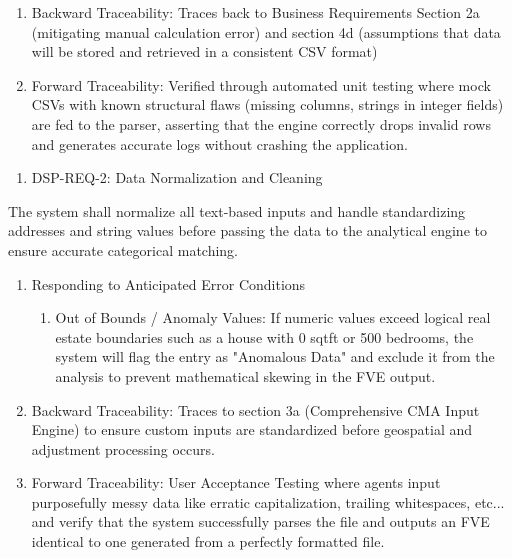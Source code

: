 \begin{enumerate}
\def\labelenumi{\alph{enumi}.}
\setcounter{enumi}{1}
\item
  Backward Traceability: Traces back to Business Requirements Section 2a
  (mitigating manual calculation error) and section 4d (assumptions that
  data will be stored and retrieved in a consistent CSV format)
\item
  Forward Traceability: Verified through automated unit testing where
  mock CSVs with known structural flaws (missing columns, strings in
  integer fields) are fed to the parser, asserting that the engine
  correctly drops invalid rows and generates accurate logs without
  crashing the application.
\end{enumerate}

\begin{enumerate}
\def\labelenumi{\Roman{enumi})}
\setcounter{enumi}{1}
\item
  DSP-REQ-2: Data Normalization and Cleaning
\end{enumerate}

The system shall normalize all text-based inputs and handle
standardizing addresses and string values before passing the data to the
analytical engine to ensure accurate categorical matching.

\begin{enumerate}
\def\labelenumi{\alph{enumi}.}
\item
  Responding to Anticipated Error Conditions

  \begin{enumerate}
  \def\labelenumii{\roman{enumii}.}
  \item
    Out of Bounds / Anomaly Values: If numeric values exceed logical
    real estate boundaries such as a house with 0 sqtft or 500 bedrooms,
    the system will flag the entry as "Anomalous Data" and exclude it
    from the analysis to prevent mathematical skewing in the FVE output.
  \end{enumerate}
\item
  Backward Traceability: Traces to section 3a (Comprehensive CMA Input
  Engine) to ensure custom inputs are standardized before geospatial and
  adjustment processing occurs.
\item
  Forward Traceability: User Acceptance Testing where agents input
  purposefully messy data like erratic capitalization, trailing
  whitespaces, etc... and verify that the system successfully parses the
  file and outputs an FVE identical to one generated from a perfectly
  formatted file.
\end{enumerate}

